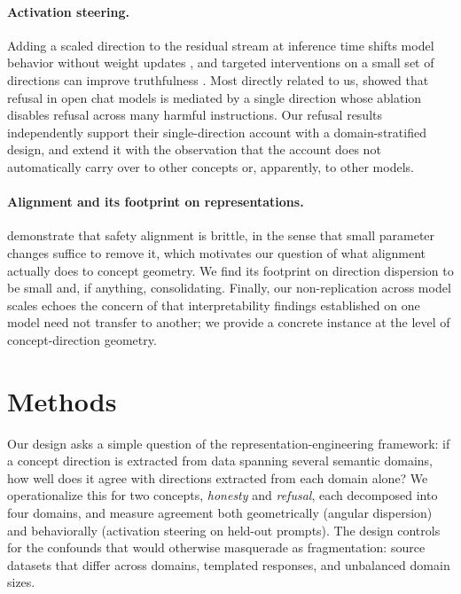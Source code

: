 \documentclass[11pt]{article}
\begin{document}
\paragraph{Activation steering.}
Adding a scaled direction to the residual stream at inference time shifts
model behavior without weight updates \citep{turner2023activation}, and
targeted interventions on a small set of directions can improve truthfulness
\citep{li2024inference}. Most directly related to us,
\citet{arditi2024refusal} showed that refusal in open chat models is
mediated by a single direction whose ablation disables refusal across many
harmful instructions. Our refusal results independently support their
single-direction account with a domain-stratified design, and extend it with
the observation that the account does not automatically carry over to other
concepts or, apparently, to other models.

\paragraph{Alignment and its footprint on representations.}
\citet{wei2024assessing} demonstrate that safety alignment is brittle, in
the sense that small parameter changes suffice to remove it, which motivates
our question of what alignment actually does to concept geometry. We find its footprint on
direction dispersion to be small and, if anything, consolidating. Finally,
our non-replication across model scales echoes the concern of
\citet{lieberum2023does} that interpretability findings established on one
model need not transfer to another; we provide a concrete instance at the
level of concept-direction geometry.


\section{Methods}
\label{sec:methods}

Our design asks a simple question of the representation-engineering
framework: if a concept direction is extracted from data spanning several
semantic domains, how well does it agree with directions extracted from each
domain alone? We operationalize this for two concepts, \textit{honesty} and
\textit{refusal}, each decomposed into four domains, and measure agreement
both geometrically (angular dispersion) and behaviorally (activation
steering on held-out prompts). The design controls for the confounds that
would otherwise masquerade as fragmentation: source datasets that differ
across domains, templated responses, and unbalanced domain sizes.
\end{document}
